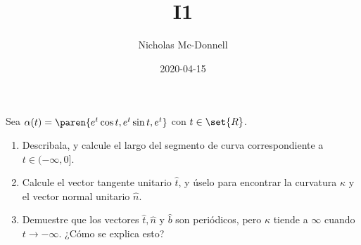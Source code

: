 \documentclass{homework}
\title{I1}
\date{2020-04-15}
\author{Nicholas Mc-Donnell}
\begin{document}
\maketitle
\newpage
{}

\begin{prob}
    Sea \(\alpha(t)=\paren{e^t\cos t,e^t \sin t, e^t}\) con \(t\in\set{R}\).
    \begin{enumerate}
        \item Describala, y calcule el largo del segmento de curva correspondiente a \(t\in(-\infty,0]\).
        \item Calcule el vector tangente unitario \(\hat{t}\), y úselo para encontrar la curvatura \(\kappa\) y el vector normal unitario \(\hat{n}\).
        \item Demuestre que los vectores \(\hat{t},\hat{n}\) y \(\hat{b}\) son periódicos, pero \(\kappa\) tiende a \(\infty\) cuando \(t\rightarrow -\infty\). ¿Cómo se explica esto?
    \end{enumerate}
\end{prob}
\end{document}
